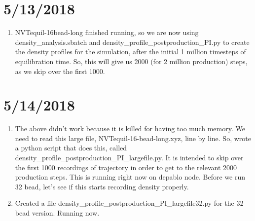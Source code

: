\documentclass[12pt,reqno]{amsart}
\numberwithin{equation}{section}
\begin{document}
\section{5/13/2018}

\begin{enumerate}
\item NVTequil-16bead-long finished running, so we are now using density\_analysis.sbatch and density\_profile\_postproduction\_PI.py to create the density profiles for the simulation, after the initial 1 million timesteps of equilibration time.  So, this will give us 2000 (for 2 million production) steps, as we skip over the first 1000.  
\end{enumerate}

\section{5/14/2018}

\begin{enumerate}
\item The above didn't work because it is killed for having too much memory.  We need to read this large file, NVTequil-16-bead-long.xyz, line by line.  So, wrote a python script that does this, called density\_profile\_postproduction\_PI\_largefile.py.  It is intended to skip over the first 1000 recordings of trajectory in order to get to the relevant 2000 production steps.  This is running right now on depablo node.  Before we run 32 bead, let's see if this starts recording density properly.  
\item Created a file density\_profile\_postproduction\_PI\_largefile32.py for the 32 bead version.  Running now.  
\end{enumerate}
\end{document}
